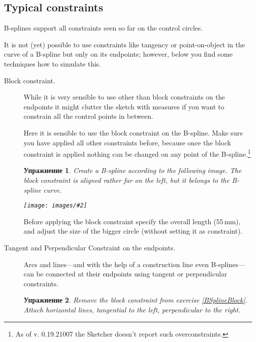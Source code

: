 \documentclass[12pt,titlepage]{article}
\newcommand{\img}[2]{\vspace{2ex}\noindent\texttt{[image: images/\#2]}}
\newtheorem{Exercise}{Упражнение}
\newcommand{\currentVersion}{0.19.21007}
\begin{document}
\subsection*{Typical constraints}

B-splines support all constraints seen so far on the control circles.

It is not (yet) possible to use constraints like tangency or point-on-object in the curve of a B-spline but only on its endpoints; however, below you find some techniques how to
simulate this.

\begin{description}
\item [Block constraint.]
While it is very sensible to use other than block constraints on the endpoints
it might clutter the sketch with measures if you want to constrain all the
control points in between.

Here it is sensible to use the block constraint on the B-spline. Make sure you
have applied all other constraints before, because once the block constraint
is applied nothing can be changed on any point of the B-spline.\footnote{As of
v. \currentVersion{} the Sketcher doesn't report such overconstraints.}

\newlength{\listWidth}
\setlength{\listWidth}{\textwidth}
\addtolength{\listWidth}{-\leftmargini}
\begin{minipage}{\listWidth}
\begin{Exercise}
\label{BSplineBlock}
Create a B-spline according to the following image. The block constraint is
aligned rather far on the left, but it belongs to the B-spline curve.

\img{}{BSplineBlock}
\end{Exercise}
\end{minipage}

Before applying the block constraint specify the overall length (55\,mm), and adjust the size
of the bigger circle (without setting it as constraint).

\item [Tangent and Perpendicular Constraint on the endpoints.]Arcs and
      lines---and with the help of a construction line even B-splines---can be
      connected at their endpoints using tangent or perpendicular constraints.

\begin{Exercise}
Remove the block constraint from exercise \vref{BSplineBlock}. Attach
horizontal lines, tangential to the left, perpendicular to the right.
\end{Exercise}


\end{description}
\end{document}
